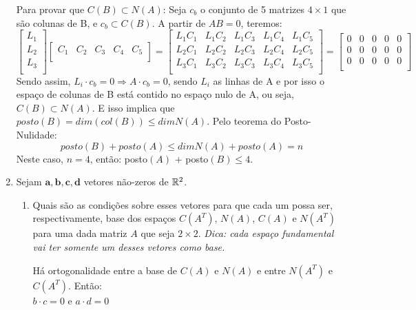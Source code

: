 \documentclass[leqno]{article}
\begin{document}
\begin{enumerate}
		\begin{sol} 
			Para provar que $C(B) \subset N(A)$:
			Seja $c_b$ o conjunto de 5 matrizes $4 \times 1$ que são colunas de B, e $c_b \subset C(B)$. A partir de $AB = 0$, teremos:
			$$\begin{bmatrix}
				L_1 \\
				L_2 \\
				L_3 \\
			\end{bmatrix}\begin{bmatrix}
				C_1 & C_2 & C_3 & C_4 & C_5 \\
			\end{bmatrix} = \begin{bmatrix}
				L_1C_1 & L_1C_2 & L_1C_3 & L_1C_4 & L_1C_5 \\
				L_2C_1 & L_2C_2 & L_2C_3 & L_2C_4 & L_2C_5 \\
				L_3C_1 & L_3C_2 & L_3C_3 & L_3C_4 & L_3C_5 \\
			\end{bmatrix}= \begin{bmatrix}
				0 & 0 & 0 & 0 & 0\\
				0 & 0 & 0 & 0 & 0\\
				0 & 0 & 0 & 0 & 0\\
			\end{bmatrix}$$
			Sendo assim, $L_i \cdot c_b = 0 \Rightarrow A \cdot c_b = 0$, sendo $L_i$ as linhas de A e por isso o espaço de colunas de B está contido no espaço nulo de A, ou seja, $C(B) \subset N(A)$. E isso implica que $posto(B) = dim(col(B)) \leq dimN (A)$. 
			Pelo teorema do Posto-Nulidade:
			$$posto (B) + posto (A) \leq dimN (A) + posto (A) = n$$ 
			Neste caso, $n = 4$, então:  posto$(A)$ $ + $ posto$(B) \leq 4$.
			
		\end{sol} 
		
		\item Sejam $\mathbf{a,b,c,d}$ vetores não-zeros de $\mathbb{R}^2$.
		
		\begin{enumerate}
			
			\item Quais são as condições sobre esses vetores para que cada um possa ser, respectivamente, base dos espaços $C(A^T)$, $N(A)$, $C(A)$ e $N(A^T)$ para uma dada matriz $A$ que seja $2 \times 2$. \textit{Dica: cada espaço fundamental vai ter somente um desses vetores como base.}
			
			\begin{sol} 
				Há ortogonalidade entre a base de $C(A)$ e $N(A)$ e entre $N(A^T)$ e $C(A^T)$. Então:\\
				$b \cdot c = 0$ e $a \cdot d = 0$
			\end{sol} 
			

\end{enumerate}
\end{enumerate}
\end{document}
